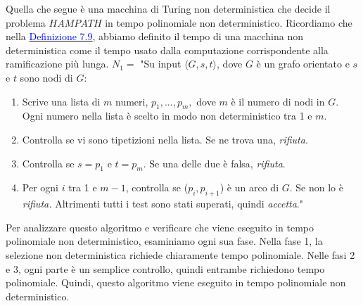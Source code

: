 \documentclass{article}
\begin{document}
Quella che segue è una macchina di Turing non deterministica che decide
il problema $HAMPATH$ in tempo polinomiale non deterministico. 
Ricordiamo che nella \hyperref[definizione-7.9]{\textcolor{blue}{Definizione 7.9}}, abbiamo definito il tempo di una macchina non deterministica come il tempo usato dalla computazione corrispondente alla ramificazione più lunga.
\vspace{1em}
\text{}
\newline
$N_1 =$ "Su input $\langle G, s, t \rangle$, dove $G$ è un grafo orientato e $s$ e $t$ sono nodi di $G$:
\begin{enumerate}
    \item Scrive una lista di $m$ numeri, $p_1,...,p_m,$ dove $m$ è il numero di nodi in $G$. Ogni numero nella lista è scelto in modo non deterministico tra 1 e $m$.
    \item Controlla se vi sono tipetizioni nella lista. Se ne trova una, \textit{rifiuta}.
    \item Controlla se $s = p_1$ e $t = p_m$. Se una delle due è falsa, \textit{rifiuta}.
    \item Per ogni $i$ tra 1 e $m - 1$, controlla se ($p_i,p_{i+1}$) è un arco di $G$. Se non lo è \textit{rifiuta.}  Altrimenti tutti i test sono stati superati, quindi \textit{accetta}."
\end{enumerate}
Per analizzare questo algoritmo e verificare che viene eseguito in tempo polinomiale non deterministico, esaminiamo ogni sua fase. 
Nella fase 1, la selezione non deterministica richiede chiaramente tempo polinomiale. 
Nelle fasi 2 e 3, ogni parte è un semplice controllo, quindi entrambe richiedono tempo polinomiale.
Quindi, questo algoritmo viene eseguito in tempo polinomiale non deterministico.
\vspace{1em}
\text{}
\newline
\end{document}
